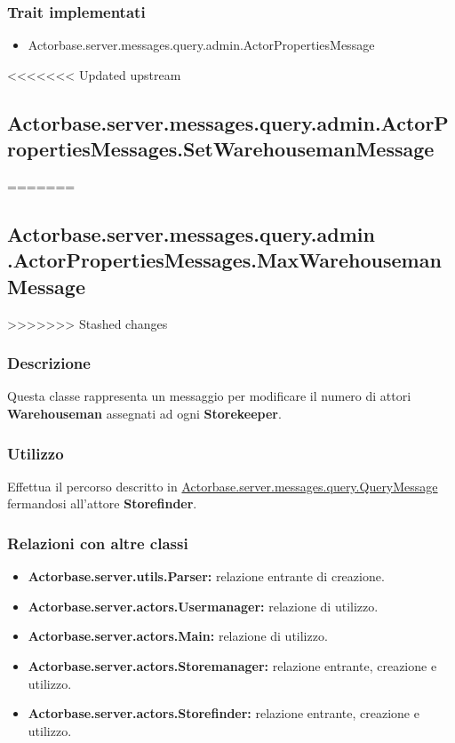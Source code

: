 \documentclass[a4paper]{article}
\begin{document}
			\subsubsection{Trait implementati}
				\begin{itemize}
					\item Actorbase.server.messages.query.admin.ActorPropertiesMessage
				\end{itemize}

<<<<<<< Updated upstream
		\subsection{Actorbase.server.messages.query.admin.ActorPropertiesMessages.SetWarehousemanMessage}
=======
		\subsection{Actorbase.server.messages.query.admin \newline
		.ActorPropertiesMessages.MaxWarehousemanMessage}
>>>>>>> Stashed changes
			\subsubsection{Descrizione}
				Questa classe rappresenta un messaggio per modificare il numero di attori \textbf{Warehouseman} assegnati ad ogni \textbf{Storekeeper}.
				
			\subsubsection{Utilizzo}
				Effettua il percorso descritto in \hyperref[QueryMessage]{Actorbase.server.messages.query.QueryMessage} fermandosi all'attore 
				\textbf{Storefinder}.
				
			\subsubsection{Relazioni con altre classi}
				\begin{itemize}
					\item \textbf{Actorbase.server.utils.Parser:} relazione entrante di creazione.
					\item \textbf{Actorbase.server.actors.Usermanager:} relazione di utilizzo.
					\item \textbf{Actorbase.server.actors.Main:} relazione di utilizzo.
					\item \textbf{Actorbase.server.actors.Storemanager:} relazione entrante, creazione e utilizzo.
					\item \textbf{Actorbase.server.actors.Storefinder:} relazione entrante, creazione e utilizzo.
				\end{itemize}
\end{document}

